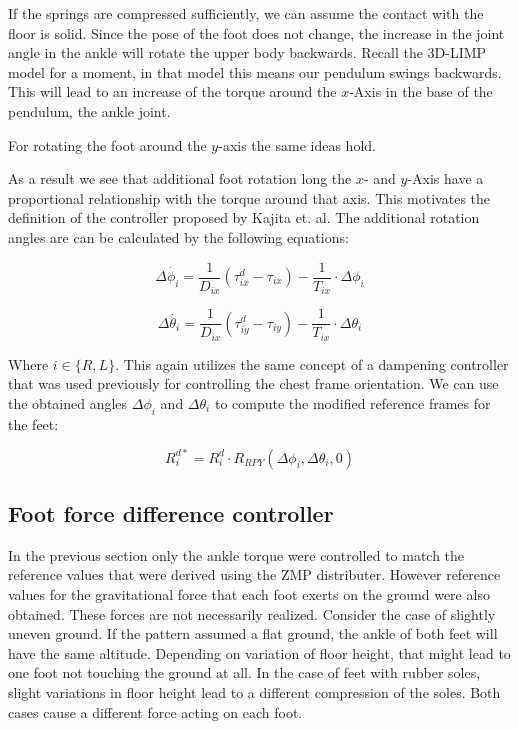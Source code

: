 \documentclass[english,ngerman]{KITreprt}
\newcommand{\clr}[2]{{\color{#1}{#2}}}
\newcommand{\todo}[1]{\marginpar{\clr{red}{#1}}}
\begin{document}
If the springs are compressed sufficiently, we can assume the contact
with the floor is solid. Since the pose of the foot does not change, the
increase in the joint angle in the ankle will rotate the upper body
backwards. Recall the 3D-LIMP model for a moment, in that model this
means our pendulum swings backwards. This will lead to an increase of
the torque around the $x$-Axis in the base of the pendulum, the ankle
joint.

For rotating the foot around the $y$-axis the same ideas hold.

As a result we see that additional foot rotation long the $x$- and
$y$-Axis have a proportional relationship with the torque around that
axis. This motivates the definition of the controller proposed by Kajita
et. al. The additional rotation angles are can be calculated by the
following equations:

\todo{Maybe add a step response to the controller}

\begin{equation}
\Delta \dot{\phi_i} = \frac{1}{D_{ix}} (\tau^d_{ix} - \tau_{ix}) - \frac{1}{T_{ix}} \cdot \Delta \phi_i
\end{equation}

\begin{equation}
\Delta \dot{\theta_i} = \frac{1}{D_{ix}} (\tau^d_{iy} - \tau_{iy}) - \frac{1}{T_{ix}} \cdot \Delta \theta_i
\end{equation}

Where $i \in \{R, L\}$. This again utilizes the same concept of a
dampening controller that was used previously for controlling the chest
frame orientation. We can use the obtained angles $\Delta \phi_i$ and
$\Delta \theta_i$ to compute the modified reference frames for the feet:

\begin{equation}
R^{d*}_i = R^d_i \cdot R_{RPY}(\Delta \phi_i, \Delta \theta_i, 0)
\end{equation}

\subsection{Foot force difference
controller}\label{foot-force-difference-controller}

In the previous section only the ankle torque were controlled to match
the reference values that were derived using the ZMP distributer.
However reference values for the gravitational force that each foot
exerts on the ground were also obtained. These forces are not
necessarily realized. Consider the case of slightly uneven ground. If
the pattern assumed a flat ground, the ankle of both feet will have the
same altitude. Depending on variation of floor height, that might lead
to one foot not touching the ground at all. In the case of feet with
rubber soles, slight variations in floor height lead to a different
compression of the soles. Both cases cause a different force acting on
each foot.
\end{document}
